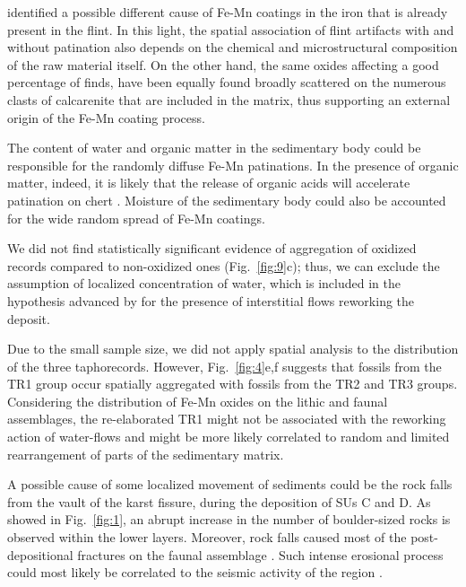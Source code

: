 \documentclass[5p,authoryear]{elsarticle} %
\begin{document}
\citet{Rottlander1975} identified a possible different cause of Fe-Mn coatings in the iron that is already present in the flint. In this light, the spatial association of flint artifacts with and without patination also depends on the chemical and microstructural composition of the raw material itself. On the other hand, the same oxides affecting a good percentage of finds, have been equally found broadly scattered on the numerous clasts of calcarenite that are included in the matrix, thus supporting an external origin of the Fe-Mn coating process.

The content of water and organic matter in the sedimentary body could be responsible for the randomly diffuse Fe-Mn patinations. In the presence of organic matter, indeed, it is likely that the release of organic acids will accelerate patination on chert \citep{Burroni2002}. Moisture of the sedimentary body could also be accounted for the wide random spread of Fe-Mn coatings.

We did not find statistically significant evidence of aggregation of oxidized records compared to non-oxidized ones (Fig.~\ref{fig:9}c); thus, we can exclude the assumption of localized concentration of water, which is included in the hypothesis advanced by \citet{Bagnus2011} for the presence of interstitial flows reworking the deposit.

Due to the small sample size, we did not apply spatial analysis to the distribution of the three taphorecords. However, Fig.~\ref{fig:4}e,f suggests that fossils from the TR1 group occur spatially aggregated with fossils from the TR2 and TR3 groups. Considering the distribution of Fe-Mn oxides on the lithic and faunal assemblages, the re-elaborated TR1 \citep[\emph{sensu}][]{Fernandez-Lopez1991,Fernandez-Lopez2007,Fernandez-Lopez2011} might not be associated with the reworking action of water-flows and might be more likely correlated to random and limited rearrangement of parts of the sedimentary matrix.

A possible cause of some localized movement of sediments could be the rock falls from the vault of the karst fissure, during the deposition of SUs C and D. As showed in Fig.~\ref{fig:1}, an abrupt increase in the number of boulder-sized rocks is observed within the lower layers. Moreover, rock falls caused most of the post-depositional fractures on the faunal assemblage \citep{Bagnus2011}. Such intense erosional process could most likely be correlated to the seismic activity of the region \citep{Bertok2013}.
\end{document}
